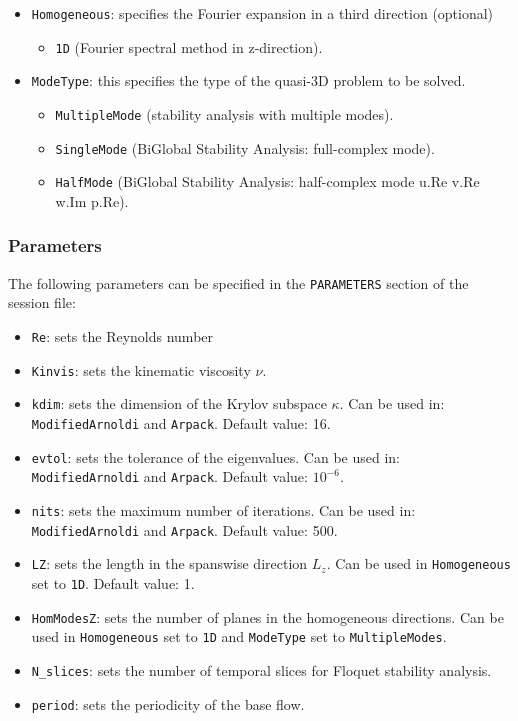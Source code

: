 \begin{itemize}
\item \texttt{Homogeneous}: specifies the Fourier expansion in a third direction (optional) 
\begin{itemize}
\item \texttt{1D} (Fourier spectral method in z-direction).
\end{itemize}
\item \texttt{ModeType}: this specifies the type of the quasi-3D problem to be solved.
\begin{itemize}
\item \texttt{MultipleMode} (stability analysis with multiple modes).
\item \texttt{SingleMode} (BiGlobal Stability Analysis: full-complex mode).
\item \texttt{HalfMode} (BiGlobal Stability Analysis: half-complex mode u.Re v.Re w.Im p.Re).
\end{itemize}
\end{itemize}

\subsubsection{Parameters}

 The following parameters can be specified in the \texttt{PARAMETERS} section of the session file: 
 
 \begin{itemize}
 \item \texttt{Re}: sets the Reynolds number 
 \item \texttt{Kinvis}: sets the kinematic viscosity $\nu$.
 \item \texttt{kdim}: sets the dimension of the Krylov subspace $\kappa$. Can be used in: \texttt{ModifiedArnoldi} and \texttt{Arpack}. Default value: 16.
 \item \texttt{evtol}: sets the tolerance of the eigenvalues. Can be used in: \texttt{ModifiedArnoldi} and \texttt{Arpack}. Default value: $10^{-6}$.
 \item \texttt{nits}: sets the maximum number of iterations. Can be used in: \texttt{ModifiedArnoldi} and \texttt{Arpack}. Default value: 500.
 \item \texttt{LZ}:  sets the length in the spanswise direction $L_z$. Can be used in \texttt{Homogeneous} set to \texttt{1D}. Default value: 1.
 \item \texttt{HomModesZ}: sets the number of planes in the homogeneous directions. Can be used in \texttt{Homogeneous} set to \texttt{1D} and \texttt{ModeType} set to \texttt{MultipleModes}.
  \item \texttt{N\_slices}: sets the number of temporal slices for Floquet stability analysis.
 \item \texttt{period}: sets the periodicity of the base flow. 
 \end{itemize}
 
